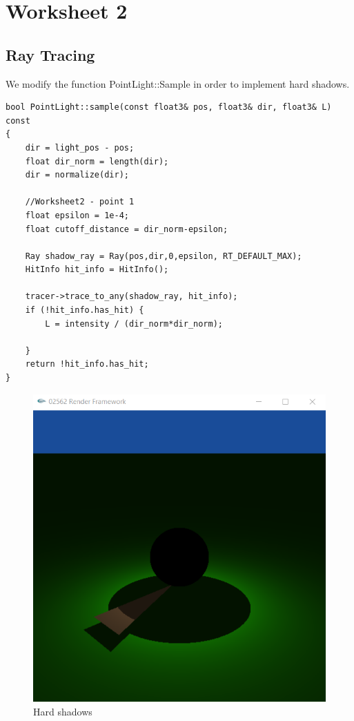 \section{Worksheet 2}

\subsection{Ray Tracing}
We modify the function PointLight::Sample in order to implement hard shadows.
\begin{lstlisting}
bool PointLight::sample(const float3& pos, float3& dir, float3& L) const
{		
	dir = light_pos - pos;
	float dir_norm = length(dir);
	dir = normalize(dir);
	
	//Worksheet2 - point 1
	float epsilon = 1e-4;
	float cutoff_distance = dir_norm-epsilon;
	
	Ray shadow_ray = Ray(pos,dir,0,epsilon, RT_DEFAULT_MAX);
	HitInfo hit_info = HitInfo();
	
	tracer->trace_to_any(shadow_ray, hit_info);
	if (!hit_info.has_hit) {
		L = intensity / (dir_norm*dir_norm);
		
	}
	return !hit_info.has_hit;
}
\end{lstlisting}
\begin{figure}[H]
	\centering
	\includegraphics[scale=\imagescale]{images/worksheet_2/part_1}
	\caption{Hard shadows}
	\label{fig:hard_shadows}
\end{figure}
